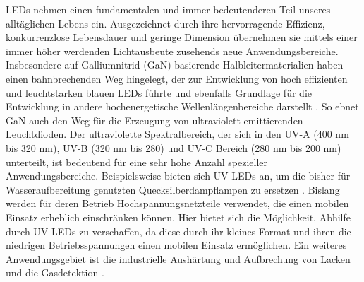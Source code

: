 LEDs nehmen einen fundamentalen und immer bedeutenderen Teil unseres alltäglichen Lebens ein. Ausgezeichnet durch ihre hervorragende Effizienz, konkurrenzlose Lebensdauer und geringe Dimension übernehmen sie mittels einer immer höher werdenden Lichtausbeute zusehends neue Anwendungsbereiche.
\newline
Insbesondere auf Galliumnitrid (GaN) basierende Halbleitermaterialien haben einen bahnbrechenden Weg hingelegt, der zur Entwicklung von hoch effizienten und leuchtstarken blauen LEDs führte und ebenfalls Grundlage für die Entwicklung in andere hochenergetische Wellenlängenbereiche darstellt \cite{risk} \cite{Shuji1999CandelaclassHI} \cite{10007979421}. So ebnet GaN auch den Weg für die Erzeugung von ultraviolett emittierenden Leuchtdioden. Der ultraviolette Spektralbereich, der sich in den UV-A (400 nm bis 320 nm), UV-B (320 nm bis 280) und UV-C Bereich (280 nm bis 200 nm) unterteilt, ist bedeutend für eine sehr hohe Anzahl spezieller Anwendungsbereiche. 
\newline
Beispielsweise bieten sich UV-LEDs an, um die bisher für Wasseraufbereitung genutzten Quecksilberdampflampen zu ersetzen \cite{Vilhunen2009} \cite{WURTELE20111481}. Bislang werden für deren Betrieb Hochspannungsnetzteile verwendet, die einen mobilen Einsatz erheblich einschränken können. Hier bietet sich die Möglichkeit, Abhilfe durch UV-LEDs zu verschaffen, da diese durch ihr kleines Format und ihren die niedrigen Betriebsspannungen einen mobilen Einsatz ermöglichen. Ein weiteres Anwendungsgebiet ist die industrielle Aushärtung und Aufbrechung von Lacken und die Gasdetektion \cite{0268-1242-26-1-014036}\cite{LALINSKY2010152}. 
\iffalse
